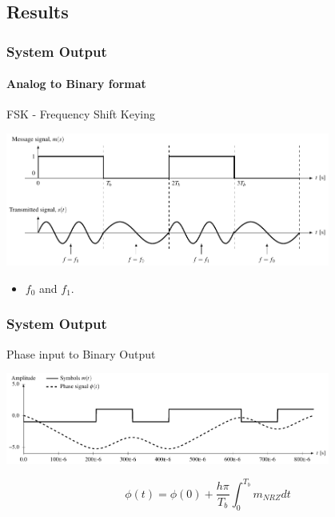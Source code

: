\subsection{Results}
\begin{frame} \frametitle{System Output}
    \framesubtitle{Analog to Binary format}
    \begin{block}{FSK - Frequency Shift Keying}    
        \begin{center}
            \includegraphics[width=0.8\textwidth]{img/gfsk_basics}
        \end{center}
        \begin{itemize}
            \item $f_0$ and $f_1$.
        \end{itemize}
    \end{block}
\end{frame}
%
\begin{frame}\frametitle{System Output}
    \begin{block}{Phase input to Binary Output} 
        \begin{center}
            \includegraphics[width=0.8\textwidth]{img/gfsk_integration} 
        \end{center}
        \begin{equation}
            \phi(t) = \phi(0) + \frac{h \pi}{T_b}\int_0^{T_b} m_{NRZ}dt
        \end{equation}
    \end{block}
\end{frame}

